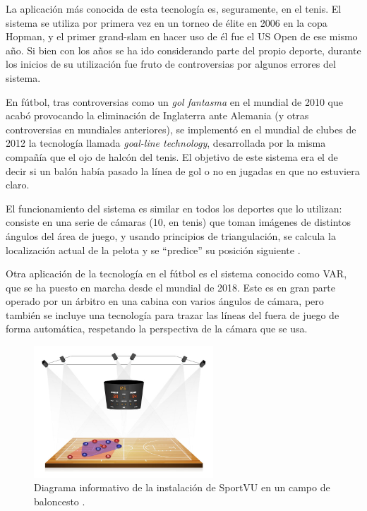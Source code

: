La aplicación más conocida de esta tecnología es, seguramente, en el tenis. El sistema se utiliza por primera vez en un torneo de élite en 2006 en la copa Hopman, y el primer grand-slam en hacer uso de él fue el US Open de ese mismo año. Si bien con los años se ha ido considerando parte del propio deporte, durante los inicios de su utilización fue fruto de controversias por algunos errores del sistema.

En fútbol, tras controversias como un \textit{gol fantasma} en el mundial de 2010 que acabó provocando la eliminación de Inglaterra ante Alemania (y otras controversias en mundiales anteriores), se implementó en el mundial de clubes de 2012 la tecnología llamada \textit{goal-line technology}, desarrollada por la misma compañía que el ojo de halcón del tenis. El objetivo de este sistema era el de decir si un balón había pasado la línea de gol o no en jugadas en que no estuviera claro. 

El funcionamiento del sistema es similar en todos los deportes que lo utilizan: consiste en una serie de cámaras (10, en tenis) que toman imágenes de distintos ángulos del área de juego, y usando principios de triangulación, se calcula la localización actual de la pelota y se ``predice'' su posición siguiente \cite{wiki:hawk}.

Otra aplicación de la tecnología en el fútbol es el sistema conocido como VAR, que se ha puesto en marcha desde el mundial de 2018. Este es en gran parte operado por un árbitro en una cabina con varios ángulos de cámara, pero también se incluye una tecnología para trazar las líneas del fuera de juego de forma automática, respetando la perspectiva de la cámara que se usa.


\begin{figure}
    \centering
    \includegraphics[width=0.6\textwidth]{images/sportVU}
    \caption{Diagrama informativo de la instalación de SportVU en un campo de baloncesto \cite{tfg}.}
    \label{fig:sportVU}
\end{figure}


